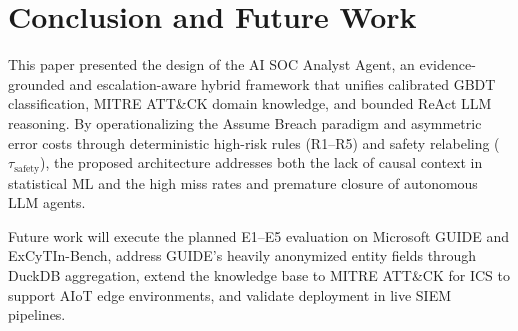 \section{Conclusion and Future Work}

This paper presented the design of the AI SOC Analyst Agent, an evidence-grounded and escalation-aware hybrid framework that unifies calibrated GBDT classification, MITRE ATT\&CK domain knowledge, and bounded ReAct LLM reasoning. By operationalizing the Assume Breach paradigm and asymmetric error costs through deterministic high-risk rules (R1--R5) and safety relabeling ($\tau_{\text{safety}}$), the proposed architecture addresses both the lack of causal context in statistical ML and the high miss rates and premature closure of autonomous LLM agents.

Future work will execute the planned E1--E5 evaluation on Microsoft GUIDE and ExCyTIn-Bench, address GUIDE's heavily anonymized entity fields through DuckDB aggregation, extend the knowledge base to MITRE ATT\&CK for ICS to support AIoT edge environments, and validate deployment in live SIEM pipelines.
